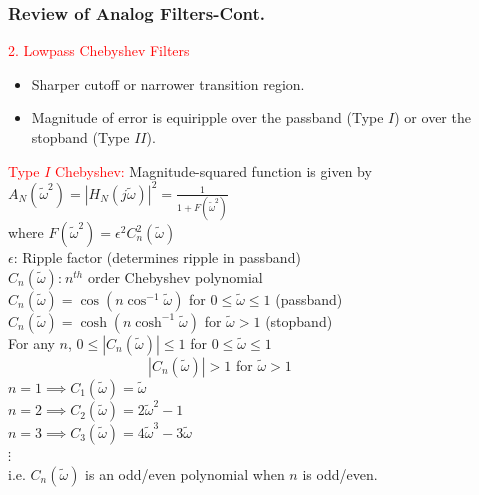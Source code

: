 \documentclass[mathserif, 10pt]{beamer} %
\begin{document}
\frame
{
\small
\frametitle{Review of Analog Filters-Cont.}

\textcolor{red}{2. Lowpass Chebyshev Filters}\\
\begin{itemize}
	\item Sharper cutoff or narrower transition region.
	\item Magnitude of error is equiripple over the passband (Type $I$) or over the stopband (Type $II$).
\end{itemize}

\textcolor{red}{Type $I$ Chebyshev:} Magnitude-squared function is given by\\
$A_N(\tilde\omega^2) = |H_N(j\tilde\omega)|^2 = \frac{1}{1+F(\tilde\omega^2)}$\\
where $F(\tilde\omega^2) = \epsilon^2C_n^2(\tilde\omega)$\\
$\epsilon$: Ripple factor (determines ripple in passband)\\
$C_n(\tilde\omega)$:$~n^{th}$ order Chebyshev polynomial\\
$C_n(\tilde\omega) = \cos{(n\cos^{-1}\tilde\omega)}$ for $0\le\tilde\omega\le1$ (passband)\\
$C_n(\tilde\omega) = \cosh{(n\cosh^{-1}\tilde\omega)}$ for $\tilde\omega >1$ (stopband)\\
For any $n$,  $0\le |C_n(\tilde\omega)|\le1$ for $0\le\tilde\omega\le 1$\\
~~~~~~~~~~~~~~~~~~~~$ |C_n(\tilde\omega)|>1$ for $\tilde\omega> 1$\\
$ n=1 \implies C_1(\tilde\omega) = \tilde\omega$\\
$n=2 \implies C_2(\tilde\omega) = 2\tilde\omega^2-1$\\
$n=3 \implies C_3(\tilde\omega) = 4\tilde\omega^3-3\tilde\omega$\\
$\vdots$\\
i.e. $C_n(\tilde\omega)$ is an odd/even polynomial when $n$ is odd/even.

}
\end{document}
